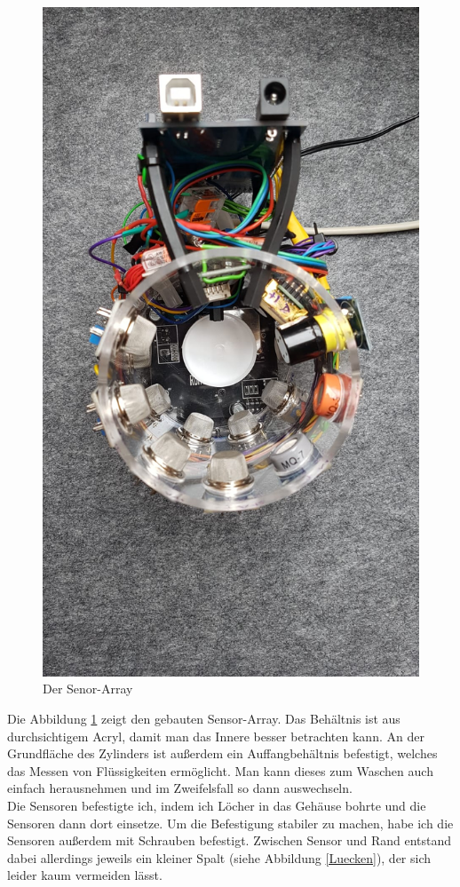\documentclass[10pt]{article}
\begin{document}
\begin{figure}[H]
\centering
\includegraphics[scale=0.15, angle=90]{Bilder/Nase_Core.jpeg}
\caption{Der Senor-Array}
\label{Nase_Core}
\end{figure} 

Die Abbildung \ref{Nase_Core} zeigt den gebauten Sensor-Array. Das Behältnis ist aus durchsichtigem Acryl, damit man das Innere besser betrachten kann. 
An der Grundfläche des Zylinders ist außerdem ein Auffangbehältnis befestigt, welches
das Messen von Flüssigkeiten ermöglicht. Man kann dieses zum Waschen auch einfach herausnehmen und im Zweifelsfall so dann
auswechseln.\\
Die Sensoren befestigte ich, indem ich Löcher in das Gehäuse bohrte und die Sensoren dann dort einsetze. Um die Befestigung stabiler zu machen,
habe ich die Sensoren außerdem mit Schrauben befestigt. Zwischen Sensor und Rand entstand dabei allerdings jeweils ein
kleiner Spalt (siehe Abbildung \ref{Luecken}), der sich leider kaum vermeiden lässt. 
\end{document}
